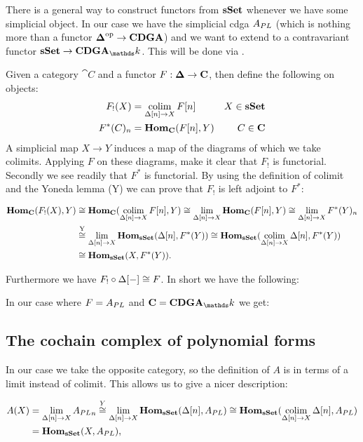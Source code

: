 
There is a general way to construct functors from $\mathbf{s{\mathbf{Set}}}$ whenever we have some simplicial object. In our case we have the simplicial cdga ${A_{PL}}$ (which is nothing more than a functor ${\boldsymbol{\Delta}}^{\text{op}} \to \mathbf{CDGA}$) and we want to extend to a contravariant functor $\sSet \to \CDGA_\k$. This will be done via .

Given a category $\cat{C}$ and a functor $F: \boldsymbol{\Delta} \to \mathbf{C}$, then define the following on objects:
\begin{align*}
	F_!(X)      &= \operatorname*{colim}_{\Delta[n] \to X} F[n] & X \in \mathbf{s{\mathbf{Set}}} \\
	F^\ast(C)_n &= \mathbf{Hom}_{\mathbf{C}}(F[n], Y)       & C \in \mathbf{C}
\end{align*}
A simplicial map $X \to Y$ induces a map of the diagrams of which we take colimits. Applying $F$ on these diagrams, make it clear that $F_!$ is functorial. Secondly we see readily that $F^\ast$ is functorial. By using the definition of colimit and the Yoneda lemma (Y) we can prove that $F_!$ is left adjoint to $F^\ast$:

\begin{align*}
	\mathbf{Hom}_{\mathbf{C}}(F_!(X), Y) &\cong \mathbf{Hom}_{\mathbf{C}}(\operatorname*{colim}_{\Delta[n] \to X} F[n], Y) \cong \lim_{\Delta[n] \to X} \mathbf{Hom}_{\mathbf{C}}(F[n], Y) \cong \lim_{\Delta[n] \to X} F^\ast(Y)_n \\
	&\stackrel{\text{Y}}{\cong} \lim_{\Delta[n] \to X} \mathbf{Hom}_{\mathbf{s{\mathbf{Set}}}}(\Delta[n], F^\ast(Y)) \cong \mathbf{Hom}_{\mathbf{s{\mathbf{Set}}}}(\operatorname*{colim}_{\Delta[n] \to X} \Delta[n], F^\ast(Y)) \\
	&\cong \mathbf{Hom}_{\mathbf{s{\mathbf{Set}}}}(X, F^\ast(Y)).
\end{align*}

Furthermore we have $F_! \circ \Delta[-] \cong F$. In short we have the following:


In our case where $F = {A_{PL}}$ and $\cat{C} = \CDGA_\k$ we get:



\subsection{The cochain complex of polynomial forms}

In our case we take the opposite category, so the definition of $A$ is in terms of a limit instead of colimit. This allows us to give a nicer description:

\begin{align*}
	A(X) &= \lim_{\Delta[n] \to X} {A_{PL}}_n \stackrel{Y}{\cong} \lim_{\Delta[n] \to X} \mathbf{Hom}_{\mathbf{s{\mathbf{Set}}}}(\Delta[n], {A_{PL}}) \cong \mathbf{Hom}_{\mathbf{s{\mathbf{Set}}}}(\operatorname*{colim}_{\Delta[n] \to X}\Delta[n], {A_{PL}}) \\
	&= \mathbf{Hom}_{\mathbf{s{\mathbf{Set}}}}(X, {A_{PL}}),
\end{align*}

